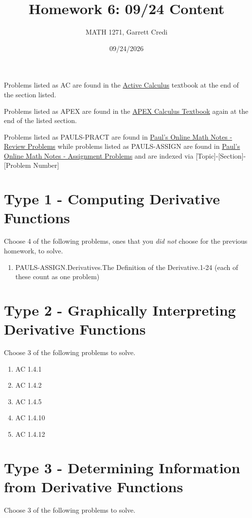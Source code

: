 \documentclass[12pt]{article}
\title{Homework 6: 09/24 Content}
\author{MATH 1271, Garrett Credi}
\date{09/24/2026}
\begin{document}
\maketitle

Problems listed as AC are found in the \href{https://activecalculus.org/single1e/frontmatter.html}{Active Calculus} 
textbook at the end of the section listed.

Problems listed as APEX are found in the \href{https://opentext.uleth.ca/apex-calculus/apex-calculus.html}{APEX Calculus Textbook}
again at the end of the listed section.

Problems listed as PAULS-PRACT are found in \href{https://tutorial.math.lamar.edu/Problems/CalcI/CalcI.aspx}{Paul's Online Math Notes - Review Problems}
while problems listed as PAULS-ASSIGN are found in \href{https://tutorial.math.lamar.edu/ProblemsNS/CalcI/CalcI.aspx}{Paul's Online Math Notes - Assignment Problems}
and are indexed via [Topic]-[Section]-[Problem Number]

\section{Type 1 - Computing Derivative Functions}
Choose 4 of the following problems,
ones that you \textit{did not} choose
for the previous homework, to solve.

\begin{enumerate}
  \item PAULS-ASSIGN.Derivatives.The Definition of the Derivative.1-24 (each of these count as one problem)
\end{enumerate}

\section{Type 2 - Graphically Interpreting Derivative Functions}
Choose 3 of the following problems to solve.

\begin{enumerate}
  \item AC 1.4.1
  \item AC 1.4.2
  \item AC 1.4.5
  \item AC 1.4.10
  \item AC 1.4.12
\end{enumerate}

\section{Type 3 - Determining Information from Derivative Functions}
Choose 3 of the following problems to solve.
\end{document}

